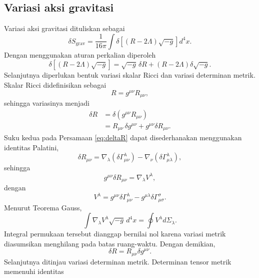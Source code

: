 \subsection*{Variasi aksi gravitasi}
Variasi aksi gravitasi dituliskan sebagai
\begin{equation} \delta S_{\mathrm{grav}} = \frac{1}{16\pi} \int \delta \left[ (R-2\Lambda)\sqrt{-g} \right] d^4x. \end{equation}
Dengan menggunakan aturan perkalian diperoleh
\begin{equation} \delta \left[ (R-2\Lambda)\sqrt{-g} \right] = \sqrt{-g}\, \delta R + (R-2\Lambda) \delta\sqrt{-g}. \label{eq:produk} \end{equation}
Selanjutnya diperlukan bentuk variasi skalar Ricci dan variasi determinan metrik. Skalar Ricci didefinisikan sebagai
\begin{equation} R = g^{\mu\nu} R_{\mu\nu}, \end{equation}
sehingga variasinya menjadi
\begin{align} \delta R &= \delta (g^{\mu\nu}R_{\mu\nu}) \nonumber\\ &= R_{\mu\nu}\, \delta g^{\mu\nu} + g^{\mu\nu} \delta R_{\mu\nu}. \label{eq:deltaR} \end{align}
Suku kedua pada Persamaan \eqref{eq:deltaR} dapat disederhanakan menggunakan identitas Palatini,
\begin{equation} \delta R_{\mu\nu} = \nabla_\lambda (\delta\Gamma^\lambda_{\mu\nu}) - \nabla_\nu (\delta\Gamma^\lambda_{\mu\lambda}), \end{equation}
sehingga
\begin{equation} g^{\mu\nu}\delta R_{\mu\nu} = \nabla_\lambda V^\lambda, \end{equation}
dengan
\begin{equation} V^\lambda = g^{\mu\nu}\delta\Gamma^\lambda_{\mu\nu} - g^{\mu\lambda} \delta\Gamma^\sigma_{\mu\sigma}. \end{equation}
Menurut Teorema Gauss,
\begin{equation} \int \nabla_\lambda V^\lambda \sqrt{-g}\, d^4x = \oint V^\lambda d\Sigma_\lambda. \end{equation}
Integral permukaan tersebut dianggap bernilai nol karena variasi metrik diasumsikan menghilang pada batas ruang-waktu. Dengan demikian,
\begin{equation} \delta R = R_{\mu\nu} \delta g^{\mu\nu}. \label{eq:deltaR2} \end{equation}
Selanjutnya ditinjau variasi determinan metrik. Determinan tensor metrik memenuhi identitas
